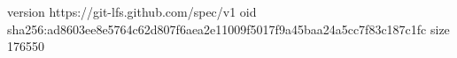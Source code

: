 version https://git-lfs.github.com/spec/v1
oid sha256:ad8603ee8e5764c62d807f6aea2e11009f5017f9a45baa24a5cc7f83c187c1fc
size 176550
